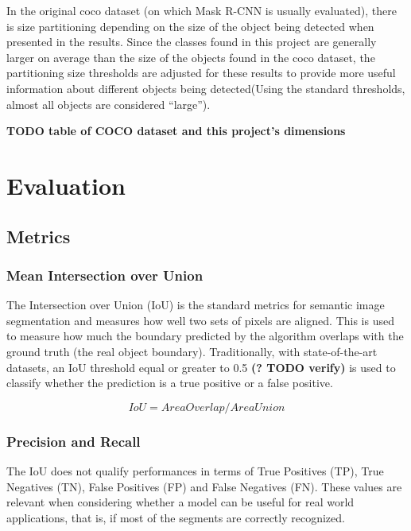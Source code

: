 \documentclass[english, bibtex]{kththesis}
\begin{document}
In the original coco dataset (on which Mask R-CNN is usually evaluated), there is size partitioning depending on the size of the object being detected when presented in the results. Since the classes found in this project are generally larger on average than the size of the objects found in the coco dataset, the partitioning size thresholds are adjusted for these results to provide more useful information about different objects being detected(Using the standard thresholds, almost all objects are considered “large”).

\textbf{TODO table of COCO dataset and this project's dimensions}


\chapter{Evaluation}
\label{ch:eval}

\section{Metrics}

\subsection{Mean Intersection over Union}

The Intersection over Union (IoU) is the standard metrics for semantic image segmentation and measures how well two sets of pixels are aligned. This is used to measure how much the boundary predicted by the algorithm overlaps with the ground truth (the real object boundary). Traditionally, with state-of-the-art datasets, an IoU threshold equal or greater to 0.5 \textbf{(? TODO verify)} is used to classify whether the prediction is a true positive or a false positive.  

\begin{equation}
	IoU = Area Overlap / Area Union
  	\label{eqn:iou}
\end{equation}


\subsection{Precision and Recall}

The IoU does not qualify performances in terms of True Positives (TP), True Negatives (TN), False Positives (FP) and False Negatives (FN). These values are relevant when considering whether a model can be useful for real world applications, that is, if most of the segments are correctly recognized. 
\end{document}
